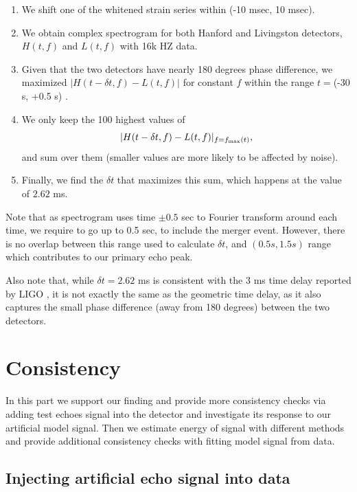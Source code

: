 \documentclass[a4paper,11pt]{article}
\begin{document}
\begin{enumerate}
\item      We shift one of the whitened strain series within (-10 msec, 10 msec).
\item      We obtain complex spectrogram for both Hanford and Livingston detectors, $H(t,f)$ and $L(t,f)$ with 16k HZ data.
\item      Given that the two detectors have nearly 180 degrees phase difference, we maximized $|H(t-\delta t,f)-L(t,f)|$ for constant $f$ within the range $t=$(-30 s, +0.5 s) . \item     We only keep the 100 highest values of $$|H(t-\delta t,f)-L(t,f)|_{f=f_{\rm max}(t)},$$ and sum over them (smaller values are more likely to be affected by noise).
\item      Finally, we find the $\delta t$ that maximizes this sum, which happens at the value of $2.62$ ms. 
\end{enumerate}

Note that as spectrogram uses time $\pm 0.5$ sec to Fourier transform around each time, we require to go up to 0.5 sec, to include the merger event. However, there is no overlap between this range used to calculate $\delta t$, and $(0.5 s, 1.5 s)$ range which contributes to our primary echo peak.  

Also note that, while $\delta t = 2.62 $ ms is consistent with the 3 ms time delay reported by LIGO \cite{TheLIGOScientific:2017qsa}, it is not exactly the same as the geometric time delay, as it also captures the small phase difference (away from 180 degrees) between the two detectors.   


\section{Consistency\label{Consistency}}

In this part we support our finding and provide more consistency checks via adding test echoes signal into the detector and investigate its response to our artificial model signal. Then we estimate energy of signal with different methods and provide additional consistency checks with fitting model signal from data. 

\subsection{Injecting artificial echo signal into data}
\end{document}
